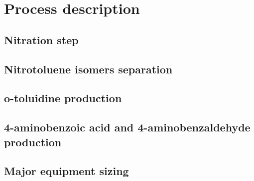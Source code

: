 \section{Process description}
\label{sec:process}
\subsection{Nitration step}

\subsection{Nitrotoluene isomers separation}

\subsection{o-toluidine production}

\subsection{4-aminobenzoic acid and 4-aminobenzaldehyde production}

\subsection{Major equipment sizing}